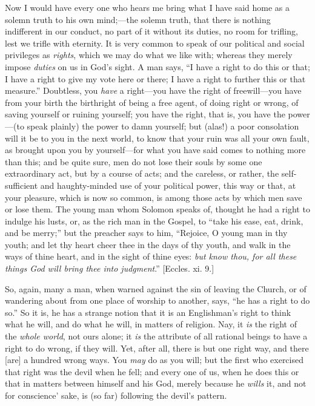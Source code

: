 Now I would have every one who hears me bring what I have said home
as a solemn truth to his own mind;—the solemn truth, that there is
nothing indifferent in our conduct, no part of it without its duties,
no room for trifling, lest we trifle with eternity. It is very common
to speak of our political and social privileges as \emph{rights},
which we may do what we like with; whereas they merely impose \emph{duties}
on us in God's sight. A man says, ``I have a right to do this or
that; I have a right to give my vote here or there; I have a right to
further this or that measure.'' Doubtless, you \emph{have} a right—you
have the right of freewill—you have from your birth the birthright
of being a free agent, of doing right or wrong, of saving yourself or
ruining yourself; you have the right, that is, you have the power—(to
speak plainly) the power to damn yourself; but (alas!) a poor
consolation will it be to you in the next world, to know that your
ruin was all your own fault, as brought upon you by yourself—for
what you have said comes to nothing more than this; and be quite sure,
men do not lose their souls by some one extraordinary act, but by a
course of acts; and the careless, or rather, the self-sufficient and
haughty-minded use of your political power, this way or that, at your
pleasure, which is now so common, is among those acts by which men
save or lose them. The young man whom Solomon speaks of, thought he
had a right to indulge his lusts, or, as the rich man in the Gospel,
to ``take his ease, eat, drink, and be merry;'' but the
preacher says to him, ``Rejoice, O young man in thy youth; and let
thy heart cheer thee in the days of thy youth, and walk in the ways of
thine heart, and in the sight of thine eyes: \emph{but know thou, for all
these things God will bring thee into judgment}.'' [Eccles. xi.
9.]

So, again, many a man, when warned against the sin of leaving the
Church, or of wandering about from one place of worship to another,
says, ``he has a right to do so.'' So it is, he has a strange
notion that it is an Englishman's right to think what he will, and
do what he will, in matters of religion. Nay, it \emph{is} the right
of the \emph{whole world}, not ours alone; it \emph{is} the attribute
of all rational beings to have a right to do wrong, if they will. Yet,
after all, there is but one right way, and there [are] a hundred wrong
ways. You \emph{may} do as you will; but the first who exercised that
right was the devil when he fell; and every one of us, when he does
this or that in matters between himself and his God, merely because he
\emph{wills} it, and not for conscience' sake, is (so far) following
the devil's pattern.

